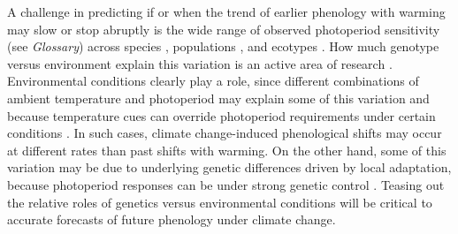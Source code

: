 \documentclass{article}
\begin{document}

 \par A challenge in predicting if or when the trend of earlier phenology with warming may slow or stop abruptly is the wide range of observed photoperiod sensitivity (see \emph{Glossary}) across species \citep{flynn2018,zohner2016,Sanz-Perez:2009aa}, populations \citep{gauzere2017,saikkonen2012,Caffarra:2011b,bradshaw2007,Vihera-Aarnio:2006aa,Partanen:2005aa}, and ecotypes \citep{Howe:1995aa}. How much genotype versus environment explain this variation is an active area of research \citep[e.g.,][]{frejaville2019,franks2014,gould2010,mimura2010}. Environmental conditions clearly play a role, since different combinations of ambient temperature and photoperiod may explain some of this variation and because temperature cues can override photoperiod requirements under certain conditions \citep [e.g.,][] {tanino2010}. In such cases, climate change-induced phenological shifts may occur at different rates than past shifts with warming. On the other hand, some of this variation may be due to underlying genetic differences driven by local adaptation, because photoperiod responses can be under strong genetic control \citep[][see also Boxes 1, 2]{bradshaw1995,keller2011,weih2004}. Teasing out the relative roles of genetics versus environmental conditions will be critical to accurate forecasts of future phenology under climate change.
\end{document}
